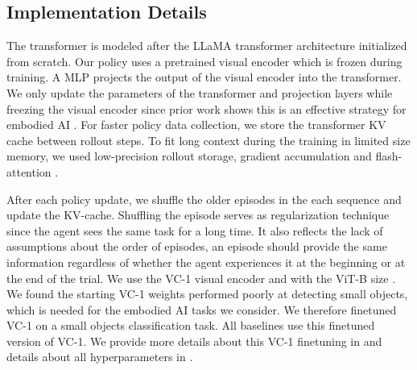 \documentclass{article}
\newcommand{\asz}[1]{}
\begin{document}
\subsection{Implementation Details}
\label{sec:impl-details}
The transformer is modeled after the LLaMA transformer architecture \citep{touvron2023llamaoa} initialized from scratch. Our policy uses a pretrained visual encoder which is frozen during training. A MLP projects the output of the visual encoder into the transformer.
We only update the parameters of the transformer and projection layers while freezing the visual encoder since prior work shows this is an effective strategy for embodied AI \citep{khandelwal2022simple,vc2023}.
For faster policy data collection, we store the transformer KV cache between rollout steps.
To fit long context during the training in limited size memory, we used low-precision rollout storage, gradient accumulation \citep{huang2019gpipe} and flash-attention \citep{dao2023flashattention2}.
\asz{What do you mean by ``low-precision rollout"? Clarify what precision you use like ``all models use bfloat16 parameters". And why the distinction with rollout? Is the weight precision different between rollouts and learning? \\Ahmad: I clarified that it's the rollout storage. FYI, I explain the model's precision in the appendix. Mainly, the model is trained with FP32, except for the visual encoder which is FP16. The rollout storage is FP16.}
After each policy update, we shuffle the older episodes in the each sequence and update the KV-cache.
Shuffling the episode serves as regularization technique since the agent sees the same task for a long time. It also reflects the lack of assumptions about the order of episodes, an episode should provide the same information regardless of whether the agent experiences it at the beginning or at the end of the trial.
We use the VC-1 visual encoder and with the ViT-B size \citep{vc2023}.
We found the starting VC-1 weights performed poorly at detecting small objects, which is needed for the embodied AI tasks we consider.
We therefore finetuned VC-1 on a small objects classification task.
All baselines use this finetuned version of VC-1.
We provide more details about this VC-1 finetuning in  and details about all hyperparameters in .
\end{document}
